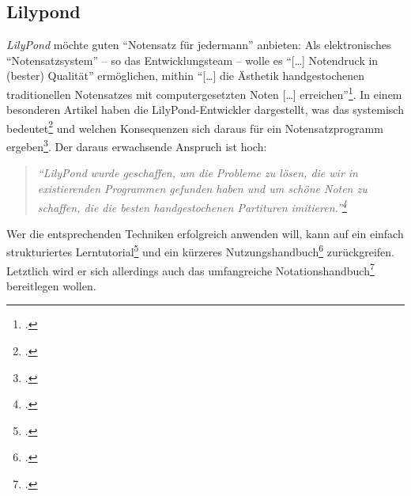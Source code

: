 %
%
%



\subsection{Lilypond}

\textit{LilyPond} möchte guten \enquote{Notensatz für jedermann} anbieten: Als
elektronisches \enquote{Notensatzsystem} -- so das Entwicklungsteam -- wolle es
\enquote{[\ldots] Notendruck in (bester) Qualität} ermöglichen, mithin
\enquote{[\ldots] die Ästhetik handgestochenen traditionellen Notensatzes mit
computergesetzten Noten [\ldots] erreichen}\footcite[vgl.][\nopage
wp]{LilyPond2018a}. In einem besonderen Artikel haben die LilyPond-Entwickler
dargestellt, was das systemisch bedeutet\footcite[vgl.][5ff]{LilyPond2018d} und
welchen Konsequenzen sich daraus für ein Notensatzprogramm
ergeben\footcite[vgl.][8ff]{LilyPond2018d}. Der daraus erwachsende Anspruch ist
hoch:

\begin{quote}
 \textit{
  \enquote{LilyPond wurde geschaffen, um die Probleme zu lösen, die wir in
  existierenden Programmen gefunden haben und um schöne Noten zu schaffen, die
  die besten handgestochenen Partituren imitieren.}\footcite[vgl.][2]{LilyPond2018d}
  }
\end{quote}

Wer die entsprechenden Techniken erfolgreich anwenden will, kann auf ein einfach
strukturiertes Lerntutorial\footcite[vgl.][20ff]{LilyPond2018b} und ein kürzeres
Nutzungshandbuch\footcite[vgl.][1ff]{LilyPond2018e} zurückgreifen. Letztlich
wird er sich allerdings auch das umfangreiche
Notationshandbuch\footcite[vgl.][1ff]{LilyPond2018c} bereitlegen wollen.

